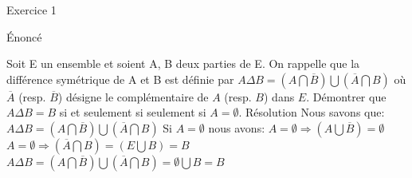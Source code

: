 \hypertarget{Exercice_1}{
\Huge{\begin{center}Exercice 1\end{center} \leavevmode\newline }}

\hypertarget{enonce}{%
\LARGE{Énoncé}\label{enonce}}
\newline
\newline
Soit E un ensemble et soient A, B deux parties de E. On rappelle que la différence symétrique de
A et B est définie par
\newline
\newline
$A \Delta B = (A \bigcap \overline{B}) \bigcup (\overline{A} \bigcap B)$
\newline
\newline
où $\overline{A}$ (resp. $\overline{B}$) désigne le complémentaire de $A$ (resp. $B$) dans $E$. Démontrer que $A \Delta B = B$ si et seulement si seulement si $A = \emptyset$.
\newline
\newline
\hypertarget{resolution}{%
\LARGE{Résolution}\label{resolution}}
\newline
\newline
Nous savons que:
\newline
\newline
$A \Delta B = (A \bigcap \overline{B}) \bigcup (\overline{A} \bigcap B)$
\newline
\newline
Si $A = \emptyset$ nous avons:
\newline
\newline
$A = \emptyset \Rightarrow (A \bigcup \overline{B}) = \emptyset$
\newline
$A = \emptyset \Rightarrow (\overline{A} \bigcap B) = (E \bigcup B) = B$
\newline
$A \Delta B = (A \bigcap \overline{B}) \bigcup (\overline{A} \bigcap B) = \emptyset \bigcup B = B$
